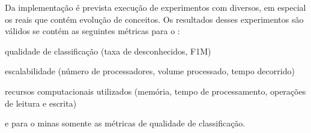 Da implementação \mfog é prevista execução de experimentos com \datasets
diversos, em especial os \datasets reais que contém evolução de conceitos.
Os resultados desses experimentos são válidos se contém as seguintes métricas
para o \mfog: \begin{enumerate*}[label={\alph*)}]
    \item qualidade de classificação (taxa de desconhecidos, F1M)
    \item escalabilidade (número de processadores, volume processado, tempo decorrido)
    \item recursos computacionais utilizados (memória, tempo de processamento, operações de leitura e escrita)
\end{enumerate*}
e para o minas somente as métricas de qualidade de classificação.





